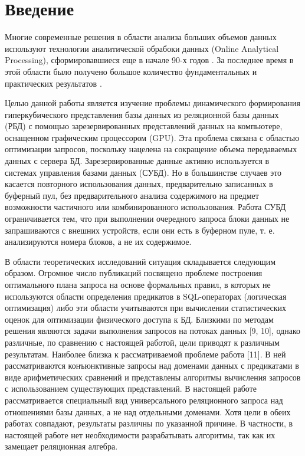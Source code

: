 \documentclass[10pt,a4paper]{article}
\author{Мосин Сергей, Зыкин Сергей}
\begin{document}
\section{Введение}
Многие современные решения в области анализа больших объемов данных
используют технологии аналитической обрабоки данных (Online Analytical
Processing), сформировавшиеся еще в начале 90-х годов \cite{codd}. За последнее
время в этой области было получено большое количество фундаментальных
\cite{lecht,lehner,mazon} и практических результатов \cite{vassi, peder,
progressive, giorg}.

Целью данной работы является изучение проблемы динамического формирования
гиперкубического представления базы данных из реляционной базы данных (РБД) с
помощью зарезервированных представлений данных на компьютере, оснащенном
графическим процессором (GPU). Эта проблема связана с областью оптимизации
запросов, поскольку нацелена на сокращение объема передаваемых данных с сервера
БД. Зарезервированные данные активно используется в системах управления базами
данных (СУБД). Но в большинстве случаев это касается повторного использования
данных, предварительно записанных в буферный пул, без предварительного анализа
содержимого на предмет возможности частичного или комбинированного
использования. Работа СУБД ограничивается тем, что при выполнении очередного
запроса блоки данных не запрашиваются с внешних устройств, если они есть в
буферном пуле, т. е. анализируются номера блоков, а не их содержимое.

В области теоретических исследований ситуация складывается следующим образом.
Огромное число публикаций посвящено проблеме построения оптимального плана
запроса на основе формальных правил, в которых не используются области
определения предикатов в SQL-операторах (логическая оптимизация) либо эти
области учитываются при вычислении статистических оценок для оптимизации
физического доступа к БД. Близкими по методам решения являются задачи
выполнения запросов на потоках данных [9, 10], однако различные, по сравнению
с настоящей работой, цели приводят к различным результатам. Наиболее близка к
рассматриваемой проблеме работа [11]. В ней рассматриваются конъюнктивные
запросы над доменами данных с предикатами в виде арифметических сравнений и
представлены алгоритмы вычисления запросов с использованием существующих
представлений. В настоящей работе рассматривается специальный вид универсального
реляционного запроса над отношениями базы данных, а не над отдельными доменами.
Хотя цели в обеих работах совпадают, результаты различны по указанной причине.
В частности, в настоящей работе нет необходимости разрабатывать алгоритмы, так
как их замещает реляционная алгебра.
\end{document}
